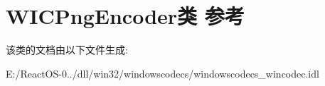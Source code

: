 \hypertarget{class_w_i_c_png_encoder}{}\section{W\+I\+C\+Png\+Encoder类 参考}
\label{class_w_i_c_png_encoder}


该类的文档由以下文件生成\+:\begin{DoxyCompactItemize}
\item 
E\+:/\+React\+O\+S-\/0../dll/win32/windowscodecs/windowscodecs\+\_\+wincodec.\+idl\end{DoxyCompactItemize}
